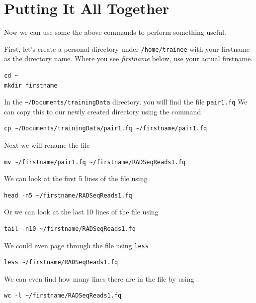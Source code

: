 \documentclass[a4paper,12pt,twoside]{memoir}
\begin{document}
\section{Putting It All Together}
Now we can use some the above commands to perform something useful. \\

\begin{steps}
First, let's create a personal directory under \texttt{/home/trainee} with your firstname as the directory name.
Where you see \textit{firstname} below, use your actual firstname. \\
\begin{lstlisting}
cd ~
mkdir firstname
\end{lstlisting}
\end{steps}

\begin{steps}
In the \texttt{\~{}/Documents/trainingData} directory, you will find the file \texttt{pair1.fq}
We can copy this to our newly created directory using the command \\
\begin{lstlisting}
cp ~/Documents/trainingData/pair1.fq ~/firstname/pair1.fq
\end{lstlisting}
Next we will rename the file \\
\begin{lstlisting}
mv ~/firstname/pair1.fq ~/firstname/RADSeqReads1.fq
\end{lstlisting}

We can look at the first 5 lines of the file using \\
\begin{lstlisting}
head -n5 ~/firstname/RADSeqReads1.fq
\end{lstlisting}
Or we can look at the last 10 lines of the file using \\
\begin{lstlisting}
tail -n10 ~/firstname/RADSeqReads1.fq
\end{lstlisting}
We could even page through the file using \texttt{less}
\begin{lstlisting}
less ~/firstname/RADSeqReads1.fq
\end{lstlisting}
We can even find how many lines there are in the file by using \\
\begin{lstlisting}
wc -l ~/firstname/RADSeqReads1.fq
\end{lstlisting}
\end{steps}
\end{document}
